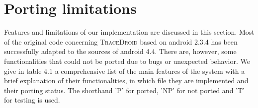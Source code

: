 \section{Porting limitations}
\label{sec:porting_limitations}

Features and limitations of our implementation are discussed in this
section. Most of the original code concerning \textsc{TraceDroid} based on
android 2.3.4 has been successfully adapted to the sources of android
4.4. There are, however, some functionalities that could not be ported
due to bugs or unexpected behavior. We give in table 4.1 a
comprehensive list of the main features of the system with a brief
explanation of their functionalities, in which file they are
implemented and their porting status. The shorthand 'P' for ported,
'NP' for not ported and 'T' for testing is used.

